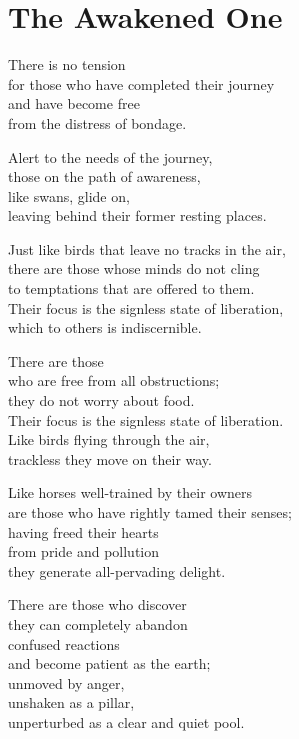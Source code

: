 
\chapter{The Awakened One}


There is no tension\\
for those who have completed their journey\\
and have become free\\
from the distress of bondage.


Alert to the needs of the journey,\\
those on the path of awareness,\\
like swans, glide on,\\
leaving behind their former resting places.


Just like birds that leave no tracks in the air,\\
there are those whose minds do not cling\\
to temptations that are offered to them.\\
Their focus is the signless state of liberation,\\
which to others is indiscernible.


There are those\\
who are free from all obstructions;\\
they do not worry about food.\\
Their focus is the signless state of liberation.\\
Like birds flying through the air,\\
trackless they move on their way.


Like horses well-trained by their owners\\
are those who have rightly tamed their senses;\\
having freed their hearts\\
from pride and pollution\\
they generate all-pervading delight.


There are those who discover\\
they can completely abandon\\
confused reactions\\
and become patient as the earth;\\
unmoved by anger,\\
unshaken as a pillar,\\
unperturbed as a clear and quiet pool.


